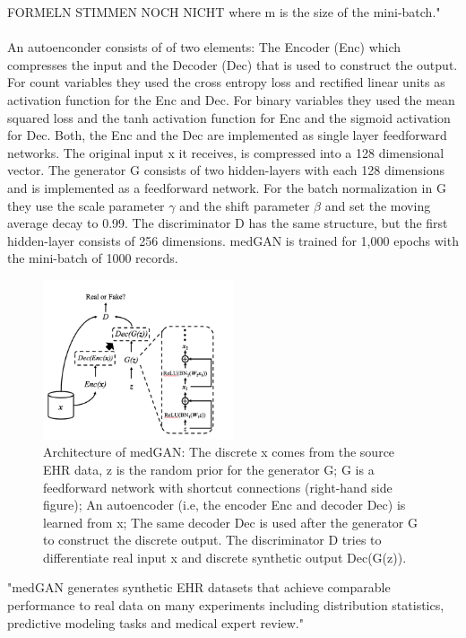 \documentclass[11pt, a4paper]{book}
\begin{document}
FORMELN STIMMEN NOCH NICHT
where m is the size of the mini-batch." \cite{Choi2017}
\\
\\
An autoenconder consists of of two elements: The Encoder (Enc) which compresses the input and the Decoder (Dec) that is used to construct the output.
For count variables they used the cross entropy loss and rectified linear units  as activation function for the Enc and Dec.
For binary variables they used the mean squared loss and the tanh activation function for Enc and the sigmoid activation for Dec.
Both, the Enc and the Dec are implemented as single layer feedforward networks. The original input x it receives, is compressed into a 128 dimensional vector. The generator G consists of two hidden-layers with each 128 dimensions and is implemented as a feedforward network. For the batch normalization in G they use the scale parameter  $\gamma$ and the shift parameter $\beta$ and set the moving average decay to 0.99. The discriminator D has the same structure, but the first hidden-layer consists of 256 dimensions. medGAN is trained for 1,000 epochs with the mini-batch of 1000 records. \cite{Choi2017}
\begin{figure}
  \begin{center}
  \includegraphics[width=0.5\textwidth]{img/medgan-architecture.png}
  \caption{Architecture of medGAN: The discrete x comes from the source EHR data, z is the random prior for the generator G; G is a feedforward network with shortcut connections (right-hand side figure); An autoencoder (i.e, the encoder Enc and decoder Dec) is learned from x; The same decoder Dec is used after the generator G to construct the discrete output. The discriminator D tries to differentiate real input x and discrete synthetic output Dec(G(z)).  \cite{Choi2017}}
  \label{fig:transfer_learning_no}
  \end{center}
\end{figure}

"medGAN generates synthetic EHR datasets that achieve comparable performance to real data on many experiments including distribution statistics, predictive modeling tasks and medical expert review."
\end{document}
